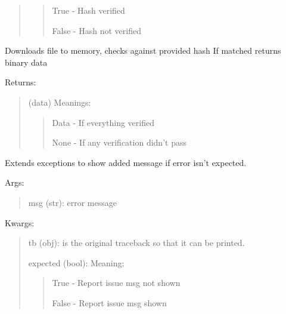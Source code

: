 \documentclass[letterpaper,10pt,english]{sphinxmanual}
\begin{document}
\begin{fulllineitems}
\begin{fulllineitems}
\begin{quote}
\begin{quote}
True - Hash verified

False - Hash not verified
\end{quote}
\end{quote}

\end{fulllineitems}


\begin{fulllineitems}
\label{api:pyi_updater.downloader.FileDownloader.download_verify_return}
Downloads file to memory, checks against provided hash
If matched returns binary data

Returns:
\begin{quote}

(data) Meanings:
\begin{quote}

Data - If everything verified

None - If any verification didn't pass
\end{quote}
\end{quote}

\end{fulllineitems}


\end{fulllineitems}

\label{api:module-pyi_updater.exceptions}

\begin{fulllineitems}
\label{api:pyi_updater.exceptions.STDError}
Extends exceptions to show added message if error isn't expected.

Args:
\begin{quote}

msg (str): error message
\end{quote}

Kwargs:
\begin{quote}

tb (obj): is the original traceback so that it can be printed.

expected (bool): Meaning:
\begin{quote}

True - Report issue msg not shown

False - Report issue msg shown
\end{quote}
\end{quote}

\end{fulllineitems}
\end{document}
